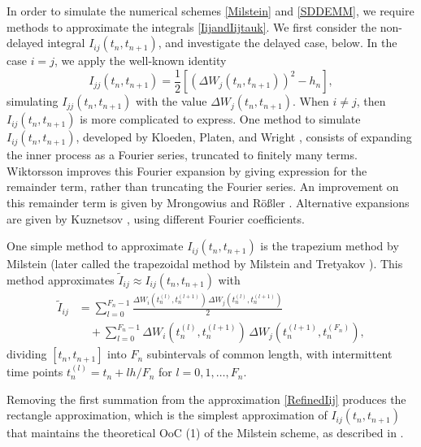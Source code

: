 \documentclass[onefignum]{siamart250211}
\begin{document}
In order to simulate the numerical schemes \cref{Milstein} and \cref{SDDEMM}, we require methods to approximate the integrals \cref{IijandIijtauk}. We first consider the non-delayed integral $I_{ij}(t_n,t_{n+1})$, and investigate the delayed case, below. In the case $i=j$, we apply the well-known identity
\[I_{jj}(t_n,t_{n+1})=\frac{1}{2}\left[(\Delta W_j(t_n,t_{n+1}))^2-h_n\right],\]
simulating $I_{jj}(t_n,t_{n+1})$ with the value $\Delta W_j(t_n,t_{n+1})$. When $i\neq j$, then $I_{ij}(t_n,t_{n+1})$ is more complicated to express. One method to simulate $I_{ij}(t_n,t_{n+1})$, developed by Kloeden, Platen, and Wright \cite{KloedenPlatenWright1992}, consists of expanding the inner process as a Fourier series, truncated to finitely many terms. Wiktorsson \cite{Wiktorsson2001} improves this Fourier expansion by giving expression for the remainder term, rather than truncating the Fourier series. An improvement on this remainder term is given by Mrongowius and R\"{o}{\ss}ler \cite{MrongowiusRosler2021}. Alternative expansions are given by Kuznetsov \cite{Kuznetsov2018,Kuznetsov2019}, using different Fourier coefficients.

One simple method to approximate $I_{ij}(t_n,t_{n+1})$ is the trapezium method by Milstein \cite{Milstein1995} (later called the trapezoidal method by Milstein and Tretyakov \cite{MilsteinTretyakov2021}). This method approximates $\tilde{I}_{ij}\approx I_{ij}(t_n,t_{n+1})$ with
\begin{align}
\tilde{I}_{ij}&=\sum_{l=0}^{F_n-1}\frac{\Delta W_i\left(t_n^{(l)},t_n^{(l+1)}\right)\,\Delta W_j\left(t_n^{(l)},t_n^{(l+1)}\right)}{2}\label{RefinedIij}\\
&\quad+\sum_{l=0}^{F_n-1}\Delta W_i\left(t_n^{(l)},t_n^{(l+1)}\right)\,\Delta W_j\left(t_n^{(l+1)},t_n^{(F_n)}\right),\nonumber
\end{align}
dividing $[t_n,t_{n+1}]$ into $F_n$ subintervals of common length, with intermittent time points $t_n^{(l)}=t_n+lh/F_n$ for $l=0,1,\ldots,F_n$.

\begin{remark}\label{SimpleRefinedRemark}
Removing the first summation from the approximation \cref{RefinedIij} produces the rectangle approximation, which is the simplest approximation of $I_{ij}(t_n,\!t_{n+1})$ that maintains the theoretical OoC (1) of the Milstein scheme, as described in \cite[\textbf{Theorem 1.5.4}]{MilsteinTretyakov2021}.
\end{remark}
\end{document}

